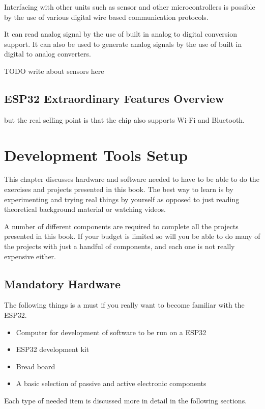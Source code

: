 \documentclass{tufte-book}
\begin{document}
Interfacing with other units such as sensor and other 
microcontrollers is possible by the use of various digital wire based 
communication protocols.

It can read analog signal by the use of built in analog to digital conversion 
support. It can also be used to generate analog signals by the use of built in 
digital to analog converters.

TODO write about sensors here

\section{ESP32 Extraordinary Features Overview} 
but the real 
selling 
point is that the chip also supports Wi-Fi and Bluetooth.

\chapter{Development Tools Setup}

This chapter discusses hardware and software needed to have to be able to do 
the exercises and projects presented in this book. The best way to learn is by 
experimenting and trying real things by yourself as opposed to just reading 
theoretical background material or watching videos.

A number of different components are required to complete all the projects 
presented in this book. If your budget is limited so will you be able to do 
many of the projects with just a handful of components, and each one is not 
really expensive either.

\section{Mandatory Hardware}\label{sec:hardware}
The following things is a must if you really want to become familiar with the ESP32.

\begin{itemize}
	\item Computer for development of software to be run on a ESP32
	\item ESP32 development kit
	\item Bread board
	\item A basic selection of passive and active electronic components
\end{itemize}

Each type of needed item is discussed more in detail in the following sections.
\end{document}
